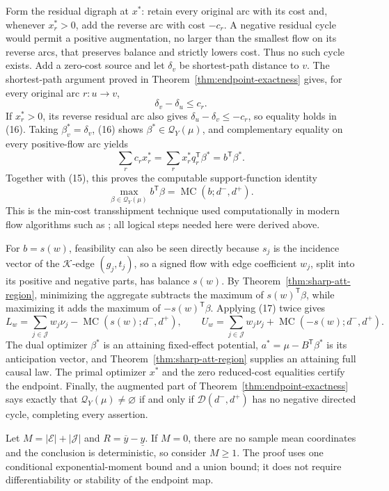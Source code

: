 Form the residual digraph at \(x^*\): retain every original arc with its cost and, whenever \(x^*_r>0\), add the reverse arc with cost \(-c_r\).  A negative residual cycle would permit a positive augmentation, no larger than the smallest flow on its reverse arcs, that preserves balance and strictly lowers cost.  Thus no such cycle exists.  Add a zero-cost source and let \(\delta_v\) be shortest-path distance to \(v\).  The shortest-path argument proved in Theorem~\ref{thm:endpoint-exactness} gives, for every original arc \(r:u\to v\),
\[
 \delta_v-\delta_u\le c_r. \tag{16}
\]
If \(x^*_r>0\), its reverse residual arc also gives \(\delta_u-\delta_v\le-c_r\), so equality holds in (16).  Taking \(\beta^*_v=\delta_v\), (16) shows \(\beta^*\in\mathcal Q_Y(\mu)\), and complementary equality on every positive-flow arc yields
\[
 \sum_r c_rx^*_r
 =\sum_r x^*_r q_r^{\mathsf T}\beta^*
 =b^{\mathsf T}\beta^*.
\]
Together with (15), this proves the computable support-function identity
\[
 \max_{\beta\in\mathcal Q_Y(\mu)}b^{\mathsf T}\beta
 =\operatorname{MC}(b;d^-,d^+). \tag{17}
\]
This is the min-cost transshipment technique used computationally in modern flow algorithms such as \cite{ChenKyngLiuPengProbstGutenbergSachdeva2022}; all logical steps needed here were derived above.

For \(b=s(w)\), feasibility can also be seen directly because \(s_j\) is the incidence vector of the \(\mathcal K\)-edge \((g_j,t_j)\), so a signed flow with edge coefficient \(w_j\), split into its positive and negative parts, has balance \(s(w)\).  By Theorem~\ref{thm:sharp-att-region}, minimizing the aggregate subtracts the maximum of \(s(w)^{\mathsf T}\beta\), while maximizing it adds the maximum of \(-s(w)^{\mathsf T}\beta\).  Applying (17) twice gives
\[
 L_w=\sum_{j\in\mathcal J}w_j\nu_j-
 \operatorname{MC}(s(w);d^-,d^+),
 \qquad
 U_w=\sum_{j\in\mathcal J}w_j\nu_j+
 \operatorname{MC}(-s(w);d^-,d^+).
\]
The dual optimizer \(\beta^*\) is an attaining fixed-effect potential, \(a^*=\mu-B^{\mathsf T}\beta^*\) is its anticipation vector, and Theorem~\ref{thm:sharp-att-region} supplies an attaining full causal law.  The primal optimizer \(x^*\) and the zero reduced-cost equalities certify the endpoint.  Finally, the augmented part of Theorem~\ref{thm:endpoint-exactness} says exactly that \(\mathcal Q_Y(\mu)\ne\varnothing\) if and only if \(\mathcal D(d^-,d^+)\) has no negative directed cycle, completing every assertion.

Let \(M=|\mathcal E|+|\mathcal J|\) and \(R=\overline y-\underline y\).  If \(M=0\), there are no sample mean coordinates and the conclusion is deterministic, so consider \(M\ge1\).  The proof uses one conditional exponential-moment bound and a union bound; it does not require differentiability or stability of the endpoint map.

